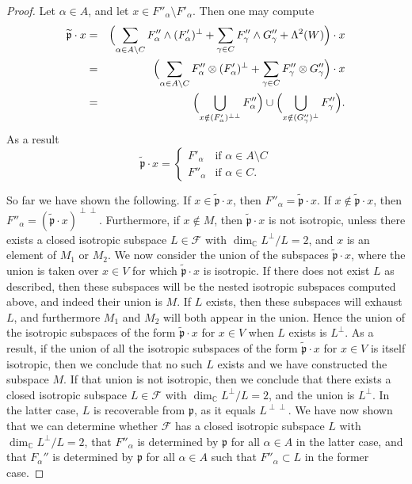 \documentclass[oneside,leqno,11pt]{article}
\def\gp{\mathfrak{p}}
\def\C{\mathbb{C}}
\def\cF{\mathcal{F}}
\begin{document}
\begin{proof}
Let $\alpha \in A$, and let $x \in F''_\alpha \setminus F'_\alpha$.  
Then one may compute
\begin{eqnarray*}
\widetilde{\gp}  \cdot x & = & \Bigl ( \sum_{\alpha \in A \setminus C} 
	F''_\alpha \wedge (F'_\alpha)^\perp + 
	\sum_{\gamma \in C} F''_\gamma \wedge G''_\gamma + \Lambda^2 
	(W) \Bigr ) \cdot x \\
& = &  \Bigl ( \sum_{\alpha \in A \setminus C} 
	F''_\alpha \otimes (F'_\alpha)^\perp + 
	\sum_{\gamma \in C} F''_\gamma \otimes G''_\gamma \Bigr )  \cdot x \\
& = & \Bigl ( \bigcup_{x \notin (F'_\alpha)^{\perp \perp}} F''_\alpha \Bigr ) \cup 
         \Bigl ( \bigcup_{x \notin (G''_\gamma)^\perp} F''_\gamma \Bigr ).
\end{eqnarray*}
As a result
$$
\widetilde{\gp}  \cdot x =
\begin{cases}
F'_\alpha & \textrm{if } \alpha \in A \setminus C \\
F''_\alpha & \textrm{if } \alpha \in C.
\end{cases}
$$

So far we have shown the following.
If $x \in \widetilde{\gp}  \cdot x$, then $F''_\alpha = \widetilde{\gp}  \cdot x$.  
If $x \notin \widetilde{\gp}  \cdot x$, then 
$F''_\alpha = ( \widetilde{\gp}  \cdot x)^{\perp \perp}$.  
Furthermore, if $x \notin M$, then $\widetilde{\gp}  \cdot x$ is not isotropic, unless 
there exists a closed isotropic subspace $L \in \cF$ with 
$\dim_\C L^\perp / L = 2$, and $x$ is an element of $M_1$ or $M_2$.  We now
consider the union of the subspaces  $\widetilde{\gp}  \cdot x$, where the union is taken
over $x \in V$ for which $\widetilde{\gp}  \cdot x$ is isotropic.  If there does not exist $L$
as described, then these subspaces will be the nested isotropic subspaces computed above, and
indeed their union is $M$.  If $L$ exists, then these subspaces will exhaust 
$L$, and furthermore $M_1$ and $M_2$ will both appear in the union.  Hence the 
union of the isotropic subspaces of the form $\widetilde{\gp}  \cdot x$ for $x \in V$ when 
$L$ exists is $L^\perp$.  As a result, if the union of all the isotropic 
subspaces of the form $\widetilde{\gp}  \cdot x$ for $x \in V$ is itself isotropic, then 
we conclude that no such $L$ exists and we have constructed the subspace $M$.  
If that union is not isotropic, then we conclude that there exists a closed 
isotropic subspace $L \in \cF$ with $\dim_\C L^\perp / L = 2$, and the union 
is $L^\perp$.  In the latter 
case, $L$ is recoverable from $\gp$, as it equals $L^{\perp \perp}$.
We have now shown that we can determine whether $\cF$ has a closed 
isotropic subspace $L$ with $\dim_\C L^\perp / L = 2$, %
that $F''_\alpha$ is determined by $\gp$ for all $\alpha \in A$ in the 
latter case, and that $F_\alpha''$ is determined by $\gp$ for all 
$\alpha \in A$ such that $F''_\alpha \subset L$ in the former case.


\end{proof}
\end{document}
